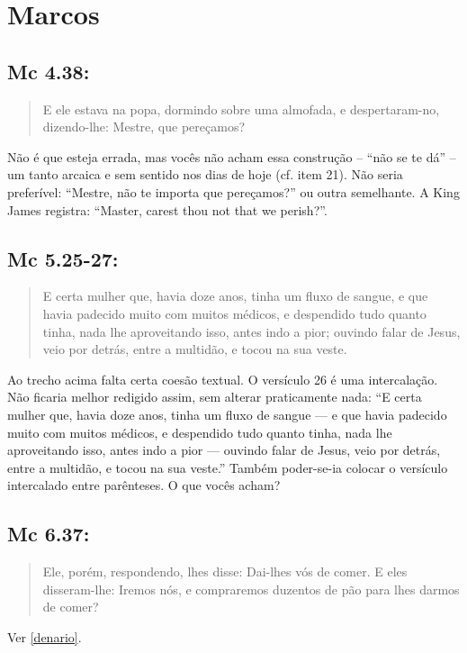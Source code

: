 \section{Marcos}\label{seteda}
\subsection*{Mc 4.38:}
\begin{quote}
 \small
E ele estava na popa, dormindo sobre uma almofada, e despertaram-no, dizendo-lhe: Mestre,  que pereçamos?
\end{quote}

Não é que esteja errada, mas vocês não acham essa construção -- ``não
se te dá'' -- um tanto arcaica e sem sentido nos dias de hoje (cf.
item 21). Não seria preferível: ``Mestre, não te importa que
pereçamos?'' ou outra semelhante. A King James registra: ``Master,
carest thou not that we perish?''.


\subsection*{Mc 5.25-27:}
\begin{quote}
    \small
E certa mulher que, havia doze anos,  tinha um fluxo de sangue, e que havia padecido muito  com muitos médicos, e despendido tudo quanto tinha, nada lhe  aproveitando isso, antes indo a pior; ouvindo falar  de Jesus, veio por detrás, entre a multidão, e tocou na sua veste.
\end{quote}

Ao trecho acima falta certa coesão textual. O versículo 26 é uma
intercalação. Não ficaria melhor redigido assim, sem alterar praticamente nada: ``E certa mulher que, havia doze anos, tinha um fluxo de sangue --- e que havia padecido
muito com muitos médicos, e despendido tudo quanto tinha, nada lhe aproveitando isso, antes indo a pior --- ouvindo falar de Jesus, veio por detrás, entre a multidão, e tocou na sua veste.'' Também poder-se-ia colocar o versículo intercalado entre parênteses. O que vocês acham?


\subsection*{Mc 6.37:}
\begin{quote}
    \small
Ele, porém, respondendo, lhes disse: Dai-lhes vós de  comer. E eles disseram-lhe: Iremos nós, e compraremos duzentos  de pão para lhes darmos de comer?
\end{quote}
Ver \ref{denario}.


